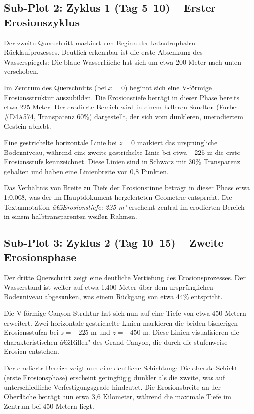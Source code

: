 ﻿\documentclass[12pt,a4paper]{report}
\begin{document}
\subsection{Sub-Plot 2: Zyklus 1 (Tag 5--10) -- Erster Erosionszyklus}

Der zweite Querschnitt markiert den Beginn des katastrophalen Rücklaufprozesses. Deutlich erkennbar ist die erste Absenkung des Wasserspiegels: Die blaue Wasserfläche hat sich um etwa 200 Meter nach unten verschoben. 

Im Zentrum des Querschnitts (bei $x = 0$) beginnt sich eine V-förmige Erosionsstruktur auszubilden. Die Erosionstiefe beträgt in dieser Phase bereits etwa 225 Meter. Der erodierte Bereich wird in einem helleren Sandton (Farbe: \#D4A574, Transparenz 60\%) dargestellt, der sich vom dunkleren, unerodiertem Gestein abhebt.

Eine gestrichelte horizontale Linie bei $z = 0$ markiert das ursprüngliche Bodenniveau, während eine zweite gestrichelte Linie bei etwa $-225$ m die erste Erosionsstufe kennzeichnet. Diese Linien sind in Schwarz mit 30\% Transparenz gehalten und haben eine Linienbreite von 0,8 Punkten.

Das Verhältnis von Breite zu Tiefe der Erosionsrinne beträgt in dieser Phase etwa 1:0,008, was der im Hauptdokument hergeleiteten Geometrie entspricht. Die Textannotation \textit{â€žErosionstiefe: 225 m"} erscheint zentral im erodierten Bereich in einem halbtransparenten weißen Rahmen.

\subsection{Sub-Plot 3: Zyklus 2 (Tag 10--15) -- Zweite Erosionsphase}

Der dritte Querschnitt zeigt eine deutliche Vertiefung des Erosionsprozesses. Der Wasserstand ist weiter auf etwa 1.400 Meter über dem ursprünglichen Bodenniveau abgesunken, was einem Rückgang von etwa 44\% entspricht.

Die V-förmige Canyon-Struktur hat sich nun auf eine Tiefe von etwa 450 Metern erweitert. Zwei horizontale gestrichelte Linien markieren die beiden bisherigen Erosionsstufen bei $z = -225$ m und $z = -450$ m. Diese Linien visualisieren die charakteristischen â€žRillen" des Grand Canyon, die durch die stufenweise Erosion entstehen.

Der erodierte Bereich zeigt nun eine deutliche Schichtung: Die oberste Schicht (erste Erosionsphase) erscheint geringfügig dunkler als die zweite, was auf unterschiedliche Verfestigungsgrade hindeutet. Die Erosionsbreite an der Oberfläche beträgt nun etwa 3,6 Kilometer, während die maximale Tiefe im Zentrum bei 450 Metern liegt.
\end{document}
